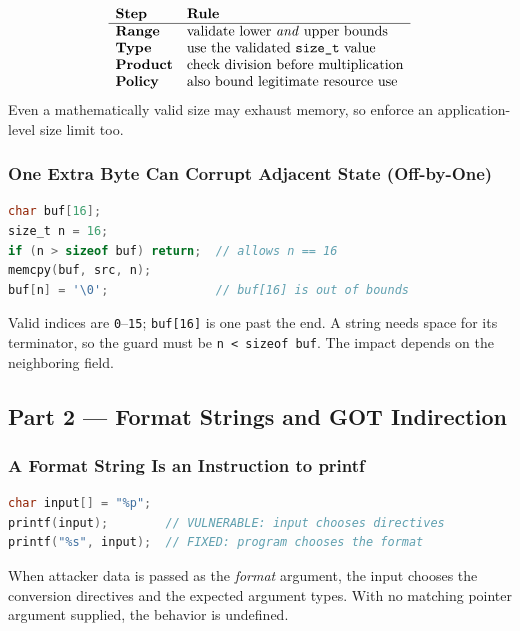 \documentclass[hidelinks]{article}
\begin{document}
\[
\begin{array}{ll}
\textbf{Step} & \textbf{Rule}\\ \hline
\textbf{Range}   & \text{validate lower \emph{and} upper bounds}\\
\textbf{Type}    & \text{use the validated \texttt{size\_t} value}\\
\textbf{Product} & \text{check division before multiplication}\\
\textbf{Policy}  & \text{also bound legitimate resource use}\\
\end{array}
\]
Even a mathematically valid size may exhaust memory, so enforce an application-level size limit too.

\subsubsection{One Extra Byte Can Corrupt Adjacent State (Off-by-One)}

\begin{lstlisting}[language=C]
char buf[16];
size_t n = 16;
if (n > sizeof buf) return;  // allows n == 16
memcpy(buf, src, n);
buf[n] = '\0';               // buf[16] is out of bounds
\end{lstlisting}
Valid indices are \texttt{0}--\texttt{15}; \texttt{buf[16]} is one past the end. A string needs space for its terminator, so the guard must be \texttt{n < sizeof buf}. The impact depends on the neighboring field.

\subsection{Part 2 --- Format Strings and GOT Indirection}

\subsubsection{A Format String Is an Instruction to printf}

\begin{lstlisting}[language=C]
char input[] = "%p";
printf(input);        // VULNERABLE: input chooses directives
printf("%s", input);  // FIXED: program chooses the format
\end{lstlisting}
When attacker data is passed as the \emph{format} argument, the input chooses the conversion directives and the expected argument types. With no matching pointer argument supplied, the behavior is undefined.
\end{document}

